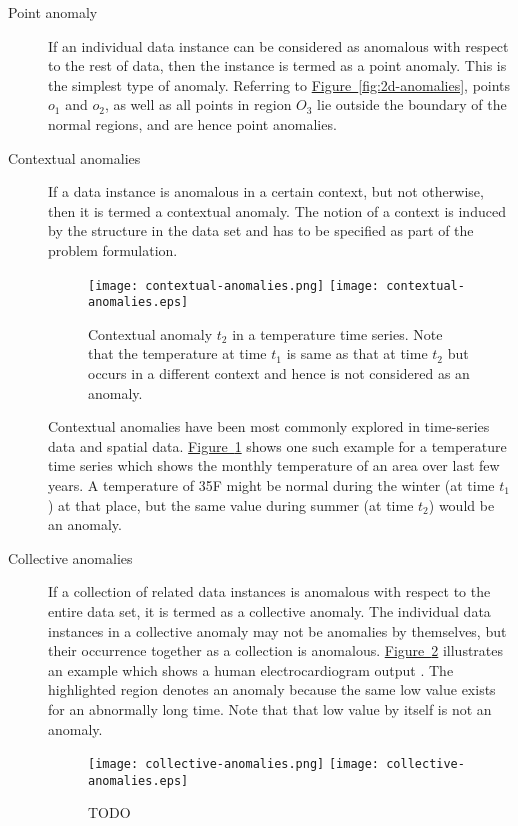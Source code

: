 \begin{description}
\item[Point anomaly] If an individual data instance can be considered as 
anomalous with respect to the rest of data, then the instance is termed as a 
point anomaly. This is the simplest type of anomaly. Referring to 
\hyperref[fig:2d-anomalies]{Figure~\ref{fig:2d-anomalies}}, points $o_{1}$ and 
$o_{2}$, as well as all points in region $O_{3}$ lie outside the boundary of the
normal regions, and are hence point anomalies.

\item[Contextual anomalies] If a data instance is anomalous in a certain 
context, but not otherwise, then it is termed a contextual anomaly. The notion 
of a context is induced by the structure in the data set and has to be specified
as part of the problem formulation.

\begin{figure}
\centering
\ifpdf
	\texttt{[image: contextual-anomalies.png]}
\else
	\texttt{[image: contextual-anomalies.eps]}
\fi
\caption{Contextual anomaly $t_{2}$ in a temperature time series. Note that the 
temperature at time $t_{1}$ is same as that at time $t_{2}$ but occurs in a 
different context and hence is not considered as an anomaly.}
\label{fig:contextual-anomalies}
\end{figure}

Contextual anomalies have been most commonly explored in time-series data and 
spatial data. \hyperref[fig:contextual-anomalies]
{Figure~\ref{fig:contextual-anomalies}} shows one such example for a temperature
time series which shows the monthly temperature of an area over last few years. 
A temperature of 35F might be normal during the winter (at time $t_{1}$) at that
place, but the same value during summer (at time $t_{2}$) would be an anomaly.

\item[Collective anomalies] If a collection of related data instances is 
anomalous with respect to the entire data set, it is termed as a collective 
anomaly. The individual data instances in a collective anomaly may not be 
anomalies by themselves, but their occurrence together as a collection is 
anomalous. \hyperref[fig:collective-anomalies]
{Figure~\ref{fig:collective-anomalies}} illustrates an example which shows a 
human electrocardiogram output \cite{Goldberger:2000}. The highlighted region 
denotes an anomaly because the same low value exists for an abnormally long 
time. Note that that low value by itself is not an anomaly.

\begin{figure}
\centering
\ifpdf
	\texttt{[image: collective-anomalies.png]}
\else
	\texttt{[image: collective-anomalies.eps]}
\fi
\caption{TODO}
\label{fig:collective-anomalies}
\end{figure}

\end{description}

